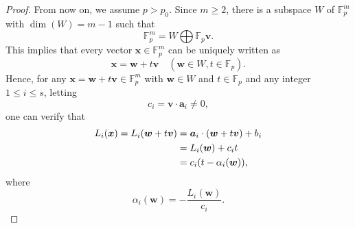 \documentclass[10pt,a4paper]{amsart}
\def\a{{\bm a}}
\def\v{{\bm v}}
\def\w{{\bm w}}
\def\x{{\bm x}}
\begin{document}
\begin{proof}
		From now on, we assume $p>p_0$. Since $m\ge2$, there is a subspace $W$ of $\mathbb{F}_p^m$ with $\dim(W)=m-1$ such that 
		$$\mathbb{F}_p^m=W\bigoplus\mathbb{F}_p\v.$$
		This implies that every vector $\x\in\mathbb{F}_p^m$ can be uniquely written as 
		$$\x=\w+t\v \quad (\w\in W, t\in\mathbb{F}_p).$$
		Hence, for any $\x=\w+t\v\in\mathbb{F}_p^m$ with $\w\in W$ and $t\in\mathbb{F}_p$ and any integer $1\le i\le s$, letting 
		\begin{equation}\label{Eq. definition of ci}
			c_i=\v\cdot\a_i\neq 0,
		\end{equation}
		one can verify that 
		\begin{align}\label{Eq. expression of Li}
			L_i(\x)=L_i(\w+t\v)
&=\a_i\cdot (\w+t\v)+b_i\notag\\
&=L_i(\w)+c_it\notag\\
&=c_i(t-\alpha_i(\w)),
		\end{align}
where 
      \begin{equation}\label{Eq. definition of alpha i}
	\alpha_i(\w)=-\frac{L_i(\w)}{c_i}.
       \end{equation}



\end{proof}
\end{document}
